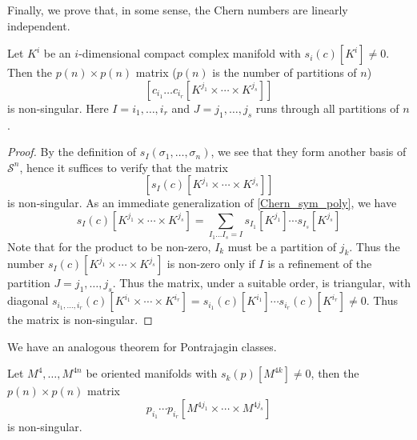 	Finally, we prove that, in some sense, the Chern numbers are linearly independent. 
	\begin{thm}\label{Chern_num_indep}
		Let $K^i$ be an $i$-dimensional compact complex manifold with $s_i(c)[K^i]\neq0$. Then the $p(n)\times p(n)$ matrix ($p(n)$ is the number of partitions of $n$)
		\[ \left[ c_{i_1}\dots c_{i_r}[K^{j_1}\times\cdots\times K^{j_s}]\right] \]
		is non-singular. Here $I=i_1,\dots,i_r$ and $J=j_1,\dots,j_s$ runs through all partitions of $n$. 
	\end{thm}
	\begin{proof}
		By the definition of $s_I(\sigma_1,\dots,\sigma_n)$, we see that they form another basis of $\mathcal{S}^n$, hence it suffices to verify that the matrix
		\[ \left[ s_I(c)[K^{j_1}\times\cdots\times K^{j_s}]\right] \]
		is non-singular. As an immediate generalization of \cref{Chern_sym_poly}, we have
		\[ s_I(c)[K^{j_1}\times\cdots\times K^{j_s}]=\sum_{I_1\dots I_s=I}s_{I_1}[K^{j_1}]\cdots s_{I_s}[K^{j_s}] \]
		Note that for the product to be non-zero, $I_k$ must be a partition of $j_k$. Thus the number $s_I(c)[K^{j_1}\times\cdots\times K^{j_s}]$ is non-zero only if $I$ is a refinement of the partition $J=j_1,\dots,j_s$. Thus the matrix, under a suitable order, is triangular, with diagonal $s_{i_1,\dots,i_r}(c)[K^{i_1}\times\cdots\times K^{i_r}]=s_{i_1}(c)[K^{i_1}]\cdots s_{i_r}(c)[K^{i_r}]\neq 0$. Thus the matrix is non-singular. 
	\end{proof}
	We have an analogous theorem for Pontrajagin classes. 
	\begin{thm}\label{Pontrajagin_num_indep}
		Let $M^4,\dots,M^{4n}$ be oriented manifolds with $s_k(p)[M^{4k}]\neq 0$, then the $p(n)\times p(n)$ matrix 
		\[ p_{i_1}\cdots p_{i_r}[M^{4j_1}\times\cdots\times M^{4j_s}] \]
		is non-singular. 
	\end{thm}


